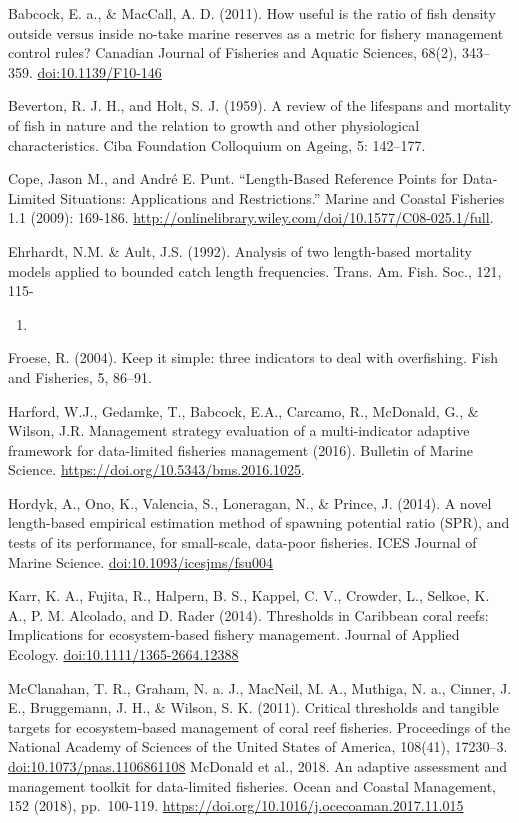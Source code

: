 \documentclass[]{book}
\begin{document}
Babcock, E. a., \& MacCall, A. D. (2011). How useful is the ratio of
fish density outside versus inside no-take marine reserves as a metric
for fishery management control rules? Canadian Journal of Fisheries and
Aquatic Sciences, 68(2), 343--359. \url{doi:10.1139/F10-146}

Beverton, R. J. H., and Holt, S. J. (1959). A review of the lifespans
and mortality of fish in nature and the relation to growth and other
physiological characteristics. Ciba Foundation Colloquium on Ageing, 5:
142--177.

Cope, Jason M., and André E. Punt. ``Length‐Based Reference Points for
Data‐Limited Situations: Applications and Restrictions.'' Marine and
Coastal Fisheries 1.1 (2009): 169-186.
\url{http://onlinelibrary.wiley.com/doi/10.1577/C08-025.1/full}.

Ehrhardt, N.M. \& Ault, J.S. (1992). Analysis of two length-based
mortality models applied to bounded catch length frequencies. Trans. Am.
Fish. Soc., 121, 115-

\begin{enumerate}
\def\labelenumi{\arabic{enumi}.}
\setcounter{enumi}{121}
\item
\end{enumerate}

Froese, R. (2004). Keep it simple: three indicators to deal with
overfishing. Fish and Fisheries, 5, 86--91.

Harford, W.J., Gedamke, T., Babcock, E.A., Carcamo, R., McDonald, G., \&
Wilson, J.R. Management strategy evaluation of a multi-indicator
adaptive framework for data-limited fisheries management (2016).
Bulletin of Marine Science. \url{https://doi.org/10.5343/bms.2016.1025}.

Hordyk, A., Ono, K., Valencia, S., Loneragan, N., \& Prince, J. (2014).
A novel length-based empirical estimation method of spawning potential
ratio (SPR), and tests of its performance, for small-scale, data-poor
fisheries. ICES Journal of Marine Science.
\url{doi:10.1093/icesjms/fsu004}

Karr, K. A., Fujita, R., Halpern, B. S., Kappel, C. V., Crowder, L.,
Selkoe, K. A., P. M. Alcolado, and D. Rader (2014). Thresholds in
Caribbean coral reefs: Implications for ecosystem-based fishery
management. Journal of Applied Ecology.
\url{doi:10.1111/1365-2664.12388}

McClanahan, T. R., Graham, N. a. J., MacNeil, M. A., Muthiga, N. a.,
Cinner, J. E., Bruggemann, J. H., \& Wilson, S. K. (2011). Critical
thresholds and tangible targets for ecosystem-based management of coral
reef fisheries. Proceedings of the National Academy of Sciences of the
United States of America, 108(41), 17230--3.
\url{doi:10.1073/pnas.1106861108} McDonald et al., 2018. An adaptive
assessment and management toolkit for data-limited fisheries. Ocean and
Coastal Management, 152 (2018), pp.~100-119.
\url{https://doi.org/10.1016/j.ocecoaman.2017.11.015}
\end{document}
